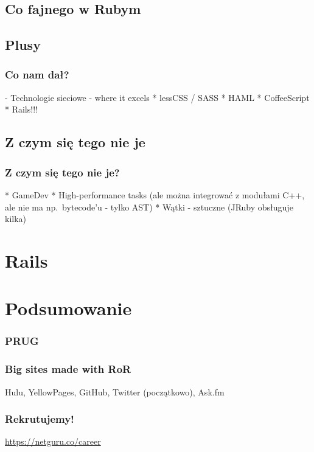 \documentclass{beamer}
\begin{document}
\subsection{Co fajnego w Rubym}


\subsection{Plusy}

\begin{frame}[fragile]
\frametitle{Co nam dał?}

- Technologie sieciowe - where it excels
* lessCSS / SASS
* HAML
* CoffeeScript
* Rails!!!
\end{frame}

\subsection{Z czym się tego nie je}

\begin{frame}[fragile]
\frametitle{Z czym się tego nie je?}
    * GameDev
    * High-performance tasks (ale można integrować z modułami C++, ale nie ma np.\ bytecode'u - tylko AST)
    * Wątki - sztuczne (JRuby obsługuje kilka)
\end{frame}

\section{Rails}


\section{Podsumowanie}

\begin{frame}[fragile]
\frametitle{PRUG}
\end{frame}

\begin{frame}[fragile]
\frametitle{Big sites made with RoR}
Hulu, YellowPages, GitHub, Twitter (początkowo), Ask.fm
\end{frame}

\begin{frame}[fragile]
\frametitle{Rekrutujemy!}
\url{https://netguru.co/career}
\end{frame}
\end{document}

